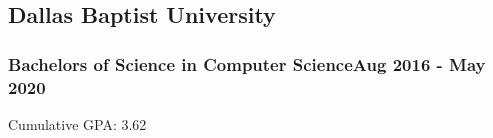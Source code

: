 
\newcommand\education[4]{
	\subsection*{#1}
	\subsubsection*{\normalfont#2\hfill\normalfont#3}
	#4
}


\education{Dallas Baptist University}{Bachelors of Science in Computer Science}{Aug 2016 - May 2020}{Cumulative GPA: 3.62}


